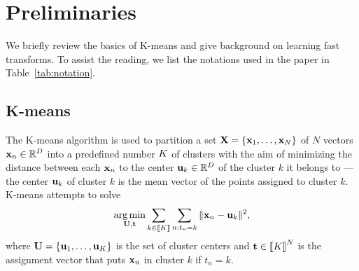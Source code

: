 \section{Preliminaries}
\label{sec:background}
We briefly review the basics of K-means and
 give background on learning fast transforms.
  To  assist  the  reading,  we  list  the notations used in the paper in Table~\ref{tab:notation}.









\subsection{K-means}
\label{sec:kmeans}
The K-means algorithm is used to partition a set ${\mathbf{X}}=\{{\mathbf{x}}_1,\ldots,{\mathbf{x}}_N\}$ of $N$  vectors ${\mathbf{x}}_n\in\mathbb{R}^{D}$ into a predefined number $K$ of clusters
with the aim of minimizing the distance between each ${\mathbf{x}}_n$ to the center ${\mathbf{u}}_k\in\mathbb{R}^{D}$
of the cluster $k$ it belongs to ---the center ${\mathbf{u}}_k$ of cluster $k$ is the
 mean vector of the points assigned to cluster $k$.
K-means attempts to solve
\begin{equation}
\label{eq:kmean_problem}
    \operatorname*{arg\,min}_{{\mathbf{U}}, {\mathbf{t}}} \sum_{k\in\left \llbracket K\right \rrbracket} \sum_{n: t_n = k} \|{\mathbf{x}}_{n} -{\mathbf{u}}_{k}\|^2,
\end{equation}
where ${\mathbf{U}}=\{{\mathbf{u}}_1,\ldots,{\mathbf{u}}_K\}$ is the set of cluster centers and ${\mathbf{t}} \in  \left \llbracket K\right \rrbracket^{N}$ is the assignment vector that puts ${\mathbf{x}}_n$ in cluster $k$
if $t_n=k$.


